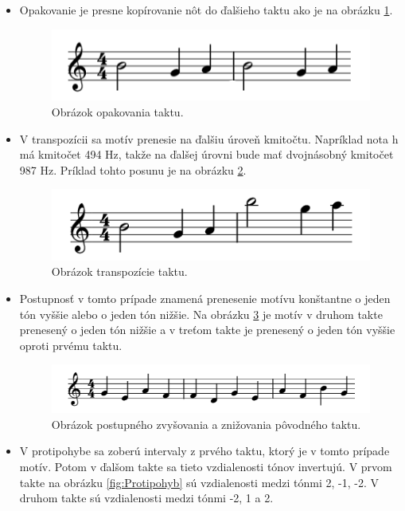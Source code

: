 \begin{itemize}\itemsep0.05em
    \item Opakovanie je presne kopírovanie nôt do ďalšieho taktu ako je na obrázku \ref{fig:repetition}.
    \begin{figure}[H]
    \centering
    \includegraphics[scale=0.4]{obrazky-figures/rep.png}
    \caption{Obrázok opakovania taktu.}
    \label{fig:repetition}
    \end{figure}
    \item V transpozícii sa motív prenesie na ďalšiu úroveň kmitočtu. Napríklad nota h má kmitočet 494 Hz, takže na ďalšej úrovni bude mať dvojnásobný kmitočet 987 Hz. Príklad tohto posunu je na obrázku \ref{fig:transpozicia}.
    \begin{figure}[H]
    \centering
    \includegraphics[scale=0.4]{obrazky-figures/trans.png}
    \caption{Obrázok transpozície taktu.}
    \label{fig:transpozicia}
    \end{figure}
    \item Postupnosť v tomto prípade znamená prenesenie motívu konštantne o jeden tón vyššie alebo o jeden tón nižšie. Na obrázku \ref{fig:Postupnost} je motív v druhom takte prenesený o jeden tón nižšie a v treťom takte je prenesený o jeden tón vyššie oproti prvému taktu.
    \begin{figure}[H]
    \centering
    \includegraphics[scale=0.4]{obrazky-figures/Post.png}
    \caption{Obrázok postupného zvyšovania a znižovania pôvodného taktu.}
    \label{fig:Postupnost}
    \end{figure}
    \item V protipohybe sa zoberú intervaly z prvého taktu, ktorý je v tomto prípade motív. Potom v ďalšom takte sa tieto vzdialenosti tónov invertujú. V prvom takte na obrázku \ref{fig:Protipohyb} sú vzdialenosti medzi tónmi 2, -1, -2. V druhom takte sú vzdialenosti medzi tónmi -2, 1 a 2.

\end{itemize}
